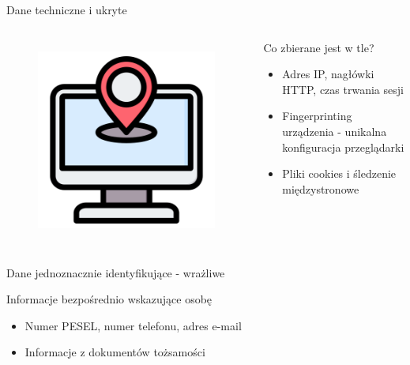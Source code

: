   
  \begin{frame}{Dane techniczne i ukryte}
  \begin{columns}[c]
      \begin{figure}
        \centering
        \includegraphics[height=0.45\textheight]{images/ip-address.png}
        \label{fig:ipTracking}
      \end{figure}
      \begin{alertblock}{Co zbierane jest w tle?}
        \begin{itemize}
          \item Adres IP, nagłówki HTTP, czas trwania sesji
          \item Fingerprinting urządzenia - unikalna konfiguracja przeglądarki
          \item Pliki cookies i śledzenie międzystronowe
        \end{itemize}
      \end{alertblock}
  \end{columns}
  \end{frame}
  
  
  \begin{frame}{Dane jednoznacznie identyfikujące - wrażliwe}
    \begin{alertblock}{Informacje bezpośrednio wskazujące osobę}
      \begin{itemize}
        \item Numer PESEL, numer telefonu, adres e-mail
        \item Informacje z dokumentów tożsamości \cite{LEXDIGITAL_CZY_IMIE_NAZW_TO_DANE_OS}
      \end{itemize}
    \end{alertblock}
  \end{frame}
  
